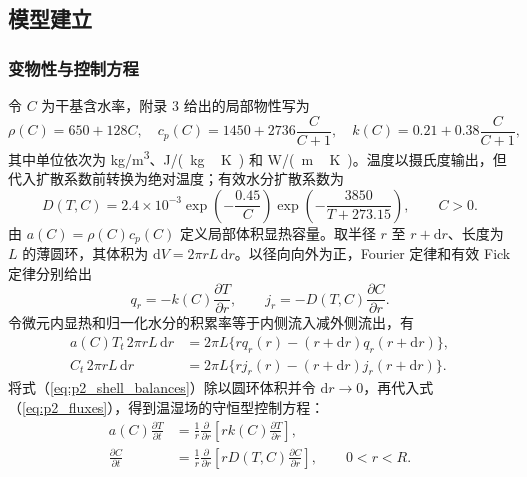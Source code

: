 \documentclass[withoutpreface,bwprint]{cumcmthesis}
\begin{document}
\subsection{模型建立}

\subsubsection{变物性与控制方程}

令 $C$ 为干基含水率，附录 3 给出的局部物性写为
\begin{equation}
\rho(C)=650+128C,\quad
c_p(C)=1450+2736\frac{C}{C+1},\quad
k(C)=0.21+0.38\frac{C}{C+1},
\label{eq:p2_thermal_properties}
\end{equation}
其中单位依次为 \si{kg/m^3}、\si{J/(kg\,K)} 和 \si{W/(m\,K)}。温度以摄氏度输出，但代入扩散系数前转换为绝对温度；有效水分扩散系数为
\begin{equation}
D(T,C)=2.4\times10^{-3}
\exp\left(-\frac{0.45}{C}\right)
\exp\left(-\frac{3850}{T+273.15}\right),\qquad C>0.
\label{eq:p2_diffusivity}
\end{equation}
由 $a(C)=\rho(C)c_p(C)$ 定义局部体积显热容量。取半径 $r$ 至 $r+\mathrm dr$、长度为 $L$ 的薄圆环，其体积为 $\mathrm dV=2\pi rL\,\mathrm dr$。以径向向外为正，Fourier 定律和有效 Fick 定律分别给出
\begin{equation}
q_r=-k(C)\frac{\partial T}{\partial r},\qquad
j_r=-D(T,C)\frac{\partial C}{\partial r}.
\label{eq:p2_fluxes}
\end{equation}
令微元内显热和归一化水分的积累率等于内侧流入减外侧流出，有
\begin{equation}
\begin{aligned}
a(C)T_t\,2\pi rL\,\mathrm dr
&=2\pi L\{rq_r(r)-(r+\mathrm dr)q_r(r+\mathrm dr)\},\\
C_t\,2\pi rL\,\mathrm dr
&=2\pi L\{rj_r(r)-(r+\mathrm dr)j_r(r+\mathrm dr)\}.
\end{aligned}
\label{eq:p2_shell_balances}
\end{equation}
将式（\ref{eq:p2_shell_balances}）除以圆环体积并令 $\mathrm dr\to0$，再代入式（\ref{eq:p2_fluxes}），得到温湿场的守恒型控制方程：
\begin{equation}
\begin{aligned}
a(C)\frac{\partial T}{\partial t}
&=\frac{1}{r}\frac{\partial}{\partial r}
\left[rk(C)\frac{\partial T}{\partial r}\right],\\
\frac{\partial C}{\partial t}
&=\frac{1}{r}\frac{\partial}{\partial r}
\left[rD(T,C)\frac{\partial C}{\partial r}\right],\qquad 0<r<R.
\end{aligned}
\label{eq:p2_pde}
\end{equation}
\end{document}
